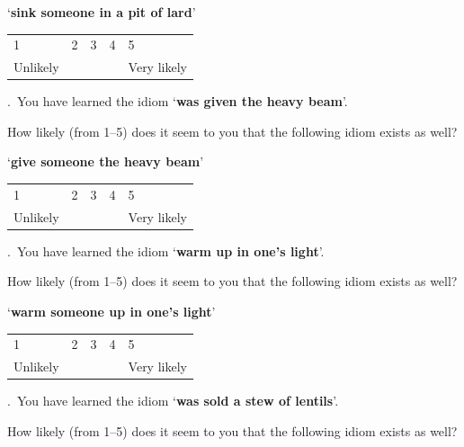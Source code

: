 \documentclass[output=paper]{langsci/langscibook}
\begin{document}
\begin{subappendices}
{\noindent \enquote*{\textbf{sink someone in a pit of lard}}\vspace{.5\baselineskip}

\noindent \begin{tabularx}{\textwidth}{XXXXX}
        1 & 2 & 3 & 4 & 5\\
        Unlikely & & & & Very likely\\
        \end{tabularx}\vspace{1\baselineskip}

.\ You have learned the idiom \enquote*{\textbf{was given the heavy beam}}.

\noindent How likely (from 1--5) does it seem to you that the following idiom exists
    as well?\vspace{.5\baselineskip}

\noindent \enquote*{\textbf{give someone the heavy beam}}\vspace{.5\baselineskip}

\noindent \begin{tabularx}{\textwidth}{XXXXX}
        1 & 2 & 3 & 4 & 5\\
        Unlikely & & & & Very likely\\
        \end{tabularx}\vspace{1\baselineskip}

.\ You have learned the idiom \enquote*{\textbf{warm up in one's light}}.

\noindent How likely (from 1--5) does it seem to you that the following idiom exists
    as well?\vspace{.5\baselineskip}

\noindent \enquote*{\textbf{warm someone up in one's light}}\vspace{.5\baselineskip}

\noindent \begin{tabularx}{\textwidth}{XXXXX}
        1 & 2 & 3 & 4 & 5\\
        Unlikely & & & & Very likely\\
        \end{tabularx}\vspace{1\baselineskip}

\newpage

.\ You have learned the idiom \enquote*{\textbf{was sold a stew of lentils}}.

\noindent How likely (from 1--5) does it seem to you that the following idiom exists
    as well?\vspace{.5\baselineskip}

}
\end{subappendices}
\end{document}
